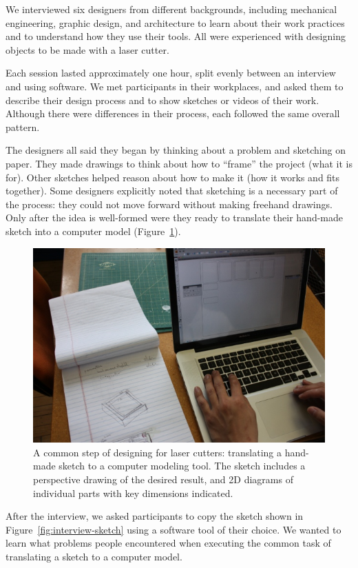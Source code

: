 \documentclass{article}
\begin{document}
We interviewed six designers from different backgrounds, including
mechanical engineering, graphic design, and architecture to learn
about their work practices and to understand how they use their
tools. All were experienced with designing objects to be made with a
laser cutter.

Each session lasted approximately one hour, split evenly between an
interview and using software. We met participants in their workplaces,
and asked them to describe their design process and to show sketches
or videos of their work. Although there were differences in their
process, each followed the same overall pattern.

The designers all said they began by thinking about a problem and
sketching on paper. They made drawings to think about how to ``frame''
the project (what it is for). Other sketches helped reason about how
to make it (how it works and fits together). Some designers explicitly
noted that sketching is a necessary part of the process: they could
not move forward without making freehand drawings. Only after the idea
is well-formed were they ready to translate their hand-made sketch
into a computer model (Figure~\ref{fig:translate}).

\begin{figure}[h]
  \centering
  \includegraphics[width=0.7\linewidth]{img/translate-sketch-to-computer.jpg}
  \caption{A common step of designing for laser cutters: translating a
    hand-made sketch to a computer modeling tool. The sketch includes
    a perspective drawing of the desired result, and 2D diagrams of
    individual parts with key dimensions indicated.}
  \label{fig:translate}
\end{figure}

After the interview, we asked participants to copy the sketch shown in
Figure~\ref{fig:interview-sketch} using a software tool of their
choice. We wanted to learn what problems people encountered when
executing the common task of translating a sketch to a computer model.
\end{document}
